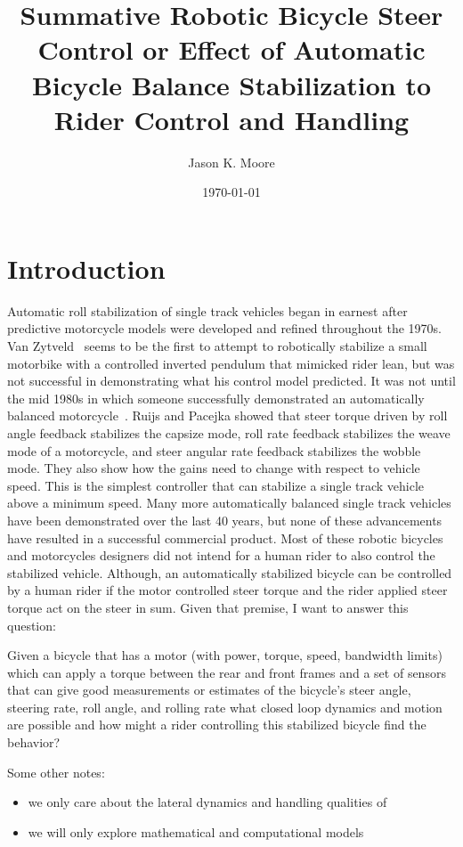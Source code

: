 \documentclass[12pt]{article}
\title{Summative Robotic Bicycle Steer Control or
Effect of Automatic Bicycle Balance Stabilization to Rider Control and
Handling}
\author{Jason K. Moore}
\date{\today}
\begin{document}
\maketitle

\section{Introduction}

Automatic roll stabilization of single track vehicles began in earnest after
predictive motorcycle models were developed and refined throughout the 1970s.
Van Zytveld~\cite{Zytveld1975} seems to be the first to attempt to robotically
stabilize a small motorbike with a controlled inverted pendulum that mimicked
rider lean, but was not successful in demonstrating what his control model
predicted. It was not until the mid 1980s in which someone successfully
demonstrated an automatically balanced motorcycle~\cite{Ruijs1986a}. Ruijs and
Pacejka showed that steer torque driven by roll angle feedback stabilizes the
capsize mode, roll rate feedback stabilizes the weave mode of a motorcycle, and
steer angular rate feedback stabilizes the wobble mode. They also show how the
gains need to change with respect to vehicle speed. This is the simplest
controller that can stabilize a single track vehicle above a minimum speed.
Many more automatically balanced single track vehicles have been demonstrated
over the last 40 years, but none of these advancements have resulted in a
successful commercial product. Most of these robotic bicycles and motorcycles
designers did not intend for a human rider to also control the stabilized
vehicle. Although, an automatically stabilized bicycle can be controlled by a
human rider if the motor controlled steer torque and the rider applied steer
torque act on the steer in sum. Given that premise, I want to answer this
question:

Given a bicycle that has a motor (with power, torque, speed, bandwidth limits)
which can apply a torque between the rear and front frames and a set of sensors
that can give good measurements or estimates of the bicycle's steer angle,
steering rate, roll angle, and rolling rate what closed loop dynamics and
motion are possible and how might a rider controlling this stabilized bicycle
find the behavior?

Some other notes:

\begin{itemize}
  \item we only care about the lateral dynamics and handling qualities of
  \item we will only explore mathematical and computational models
\end{itemize}
\end{document}
